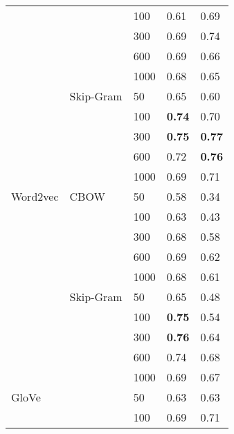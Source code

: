 \begin{table}[]
\begin{minipage}{.65\textwidth}
\begin{tabular}{@{}lllll@{}}
                    &               & 100  & 0.61             & 0.69            \\
                    &               & 300  & 0.69             & 0.74            \\
                    &               & 600  & 0.69             & 0.66            \\
                    &               & 1000 & 0.68             & 0.65            \\ \cmidrule(lr){2-5}
                    & Skip-Gram     & 50   & 0.65             & 0.60            \\
                    &               & 100  & \textbf{0.74}    & 0.70            \\
                    &               & 300  & \textbf{0.75}    & \textbf{0.77}   \\
                    &               & 600  & 0.72             & \textbf{0.76}   \\
                    &               & 1000 & 0.69             & 0.71            \\ \cmidrule(r){1-5}
Word2vec            & CBOW          & 50   & 0.58             & 0.34            \\
                    &               & 100  & 0.63             & 0.43            \\
                    &               & 300  & 0.68             & 0.58            \\
                    &               & 600  & 0.69             & 0.62            \\
                    &               & 1000 & 0.68             & 0.61            \\ \cmidrule(lr){2-5}
                    & Skip-Gram     & 50   & 0.65             & 0.48            \\
                    &               & 100  & \textbf{0.75}    & 0.54            \\
                    &               & 300  & \textbf{0.76}    & 0.64            \\
                    &               & 600  & 0.74             & 0.68            \\
                    &               & 1000 & 0.69             & 0.67            \\ \cmidrule(r){1-5}
GloVe               &               & 50   & 0.63             & 0.63            \\
                    &               & 100  & 0.69             & 0.71            \\

\end{tabular}
\end{minipage}
\end{table}
